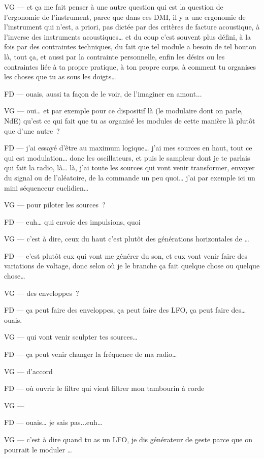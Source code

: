 VG —  et ça me fait penser à une autre question qui est la question de l'ergonomie de l'instrument, parce que dans ces DMI, il y a une ergonomie de l'instrument qui n'est, a priori, pas dictée par des critères de facture acoustique, à l'inverse des instruments acoustiques… et du coup c'est souvent plus défini, à la fois par des contraintes techniques, du fait que tel module a besoin de tel bouton là, tout ça, et aussi par la contrainte personnelle, enfin les désirs ou les contraintes liée à ta propre pratique, à ton propre corps, à comment tu organises les choses que tu as sous les doigts… 

FD —  ouais, aussi ta façon de le voir, de l'imaginer en amont... 

VG —  oui… et par exemple pour ce dispositif là (le modulaire dont on parle, NdE) qu'est ce qui fait que tu as organisé les modules de cette manière là plutôt que d'une autre ? 

FD —  j'ai essayé d'être au maximum logique… j'ai mes sources en haut, tout ce qui est modulation… donc les oscillateurs, et puis le sampleur dont je te parlais qui fait la radio, là…  là, j'ai toute les sources qui vont venir transformer, envoyer du signal ou de l'aléatoire, de la commande un peu quoi… j'ai par exemple ici un mini séquenceur euclidien… 

VG —  pour piloter les sources ? 

FD —  euh… qui envoie des impulsions, quoi 

VG —  c'est à dire, ceux du haut c'est plutôt des générations horizontales de … 

FD —  c'est plutôt eux qui vont me générer du son, et eux vont venir faire des variations de voltage, donc selon où je le branche ça fait quelque chose ou quelque chose… 

VG —  des enveloppes ? 

FD —  ça peut faire des enveloppes, ça peut faire des LFO, ça peut faire des… ouais. 

VG —  qui vont venir sculpter tes sources… 

FD —  ça peut venir changer la fréquence de ma radio… 

VG —  d'accord 

FD —  où ouvrir le filtre qui vient filtrer mon tambourin à corde 

VG —    

FD —  ouais… je sais pas...euh… 

VG —  c'est à dire quand tu as un LFO, je dis générateur de geste parce que on pourrait le moduler … 


